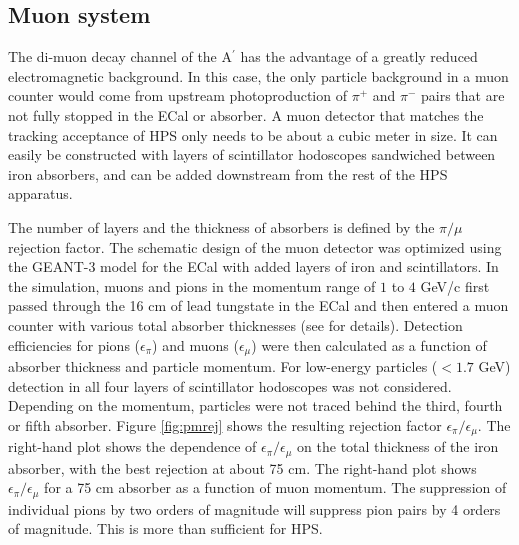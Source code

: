 \subsection{Muon system}

\label{sec:muon}


The di-muon decay channel of the A$^\prime$ has the advantage of a greatly reduced electromagnetic background.  In this case, the only particle background in a muon counter would come from upstream photoproduction of $\pi^+$ and $\pi^-$ pairs that are not fully stopped in the ECal or absorber.  A muon detector that matches the tracking acceptance of HPS only needs to be about a cubic meter in size. It can easily be constructed with layers of scintillator hodoscopes sandwiched between iron absorbers, and can be added downstream from the rest of the HPS apparatus.

The number of layers and the thickness of absorbers is defined by the $\pi/\mu$ rejection factor. The schematic design of the muon detector was optimized using the GEANT-3 model for the ECal with added layers of iron and scintillators.  In the simulation, muons and pions in the momentum range of $1$ to $4$ GeV/c first passed through the 16 cm of lead tungstate in the ECal and then entered a muon counter with various total absorber thicknesses (see \cite{HPS_PROP} for details).  Detection efficiencies for pions ($\epsilon_\pi$) and muons ($\epsilon_\mu$) were then calculated as a function of absorber thickness and particle momentum.  For low-energy particles ($< 1.7$ GeV) detection in all four layers of scintillator hodoscopes was not considered. Depending on the momentum, particles were not traced behind the third, fourth or fifth absorber.  
Figure \ref{fig:pmrej} shows the resulting rejection factor $\epsilon_\pi/\epsilon_\mu$.  The right-hand plot shows the dependence of  $\epsilon_\pi/\epsilon_\mu$ on the total thickness of the iron absorber, with the best rejection at about 75 cm.  The right-hand plot shows $\epsilon_\pi/\epsilon_\mu$ for a 75 cm absorber as a function of muon momentum.  The suppression of individual pions by two orders of magnitude will suppress pion pairs by 4 orders of magnitude.  This is more than sufficient for HPS.

